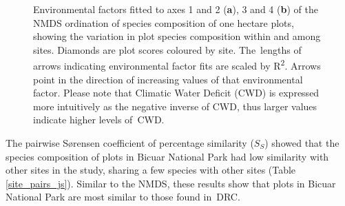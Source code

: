\documentclass[diversity,article,accept,moreauthors,pdftex]{Definitions/mdpi}
\begin{document}
\begin{figure}[H]
	\centering
    \qquad
{}%
\caption{Environmental factors fitted to axes 1 and 2 (\textbf{a}), 3 and 4 (\textbf{b}) of the NMDS ordination of species composition of one hectare plots, showing the variation in plot species composition within and among sites. Diamonds are plot scores coloured by site. The~lengths of arrows indicating environmental factor fits are scaled by R\textsuperscript{2}. Arrows point in the direction of increasing values of that environmental factor. Please note that Climatic Water Deficit (CWD) is expressed more intuitively as the negative inverse of CWD, thus larger values indicate higher levels of~CWD.}\label{fig4}
\end{figure}

The pairwise S\o{}rensen coefficient of percentage similarity ($S_{S}$) showed that the species composition of plots in Bicuar National Park had low similarity with other sites in the study, sharing a few species with other sites (Table \ref{site_pairs_js}). Similar to the NMDS, these results show that plots in Bicuar National Park are most similar to those found in~DRC. 
\end{document}

